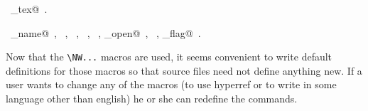 \documentclass[a4paper]{report}
\begin{document}
\begin{flushleft}
\begin{minipage}{\linewidth}
\begin{list}{}{\setlength{\itemsep}{-\parsep}\setlength{\itemindent}{-\leftmargin}}
\item \NWtxtIdentsDefed\nobreak\  \verb@write_tex@\nobreak\ .\item \NWtxtIdentsUsed\nobreak\  \verb@command_name@\nobreak\ , \verb@fclose@\nobreak\ , \verb@FILE@\nobreak\ , \verb@fopen@\nobreak\ , \verb@fprintf@\nobreak\ , \verb@source_open@\nobreak\ , \verb@stderr@\nobreak\ , \verb@verbose_flag@\nobreak\ .
\item{}
\end{list}
\end{minipage}\vspace{4ex}
\end{flushleft}
Now that the \verb|\NW...| macros are used, it seems convenient
to write default definitions for those macros so that source files
need not define anything new. If a user wants to change any of
the macros (to use hyperref or to write in some language other than
english) he or she can redefine the commands.
\end{document}
